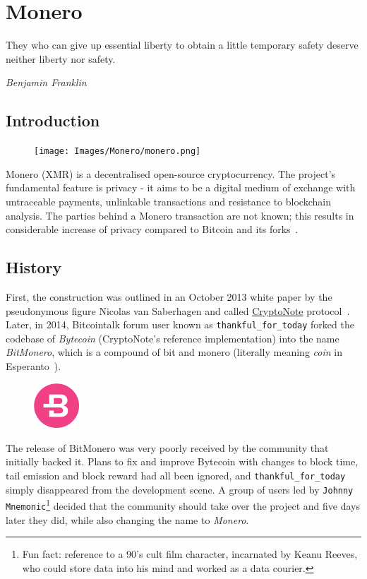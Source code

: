 \chapter{Monero} \label{sec:Monero}
%
\epigraph{They who can give up essential liberty to obtain a little temporary safety deserve neither liberty nor safety.}{\textit{Benjamin Franklin}}
%
\section{Introduction}
\begin{figure}
\centering
\texttt{[image: Images/Monero/monero.png]}
\end{figure}
Monero (XMR) is a decentralised open-source cryptocurrency. The project's fundamental feature is privacy - it aims to be a digital medium of exchange with untraceable payments, unlinkable transactions and resistance to blockchain analysis. The parties behind a Monero transaction are not known; this results in considerable increase of privacy compared to Bitcoin and its forks~\cite{monero}.

\section{History}
First, the construction was outlined in an October 2013 white paper by the pseudonymous figure Nicolas van Saberhagen and called \hyperref[sec:CryptoNote]{CryptoNote}  protocol~\cite{citeulike:14139412}. Later, in 2014, Bitcointalk forum user known as \verb|thankful_for_today| forked the codebase of \emph{Bytecoin} (CryptoNote's reference implementation) into the name \emph{BitMonero}, which is a compound of bit and monero (literally meaning \emph{coin} in Esperanto~\cite{esperanto}).

\begin{figure}
\centering
\includegraphics[width=0.15\textwidth]{Images/Monero/bytecoin.png}
\end{figure}
The release of BitMonero was very poorly received by the community that initially backed it. Plans to fix and improve Bytecoin with changes to block time, tail emission and block reward had all been ignored, and \verb|thankful_for_today| simply disappeared from the development scene. A group of users led by \verb|Johnny Mnemonic|\footnote{Fun fact: reference to a 90's cult film character, incarnated by Keanu Reeves, who could store data into his mind and worked as a data courier.} decided that the community should take over the project and five days later they did, while also changing the name to \emph{Monero}.
\pagebreak

